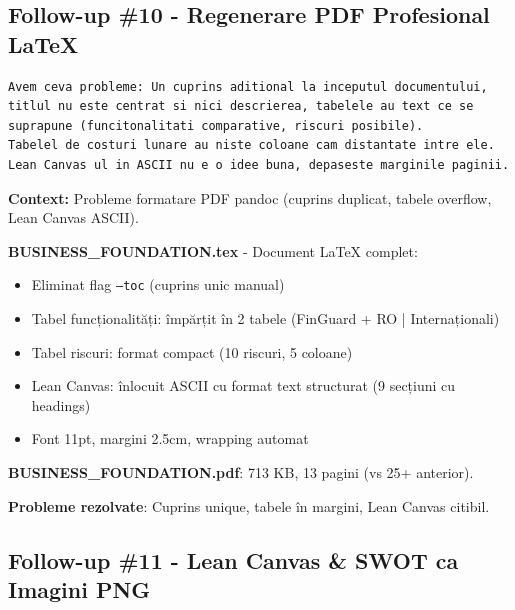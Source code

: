 \documentclass[11pt,a4paper]{article}
\begin{document}
\newpage
\subsection{Follow-up \#10 - Regenerare PDF Profesional LaTeX}

\begin{tcolorbox}[colback=promptbackground,colframe=blue!75!black,title=Prompt Input]
\begin{verbatim}
Avem ceva probleme: Un cuprins aditional la inceputul documentului,
titlul nu este centrat si nici descrierea, tabelele au text ce se
suprapune (funcitonalitati comparative, riscuri posibile).
Tabelel de costuri lunare au niste coloane cam distantate intre ele.
Lean Canvas ul in ASCII nu e o idee buna, depaseste marginile paginii.
\end{verbatim}
\end{tcolorbox}

\textbf{Context:} Probleme formatare PDF pandoc (cuprins duplicat, tabele overflow, Lean Canvas ASCII).

\begin{tcolorbox}[colback=outputbackground,colframe=green!75!black,title=Output Generat]
\textbf{BUSINESS\_FOUNDATION.tex} - Document LaTeX complet:
\begin{itemize}[leftmargin=*]
    \item Eliminat flag \texttt{--toc} (cuprins unic manual)
    \item Tabel funcționalități: împărțit în 2 tabele (FinGuard + RO | Internaționali)
    \item Tabel riscuri: format compact (10 riscuri, 5 coloane)
    \item Lean Canvas: înlocuit ASCII cu format text structurat (9 secțiuni cu headings)
    \item Font 11pt, margini 2.5cm, wrapping automat
\end{itemize}

\textbf{BUSINESS\_FOUNDATION.pdf}: 713 KB, 13 pagini (vs 25+ anterior).

\textbf{Probleme rezolvate}: Cuprins unique, tabele în margini, Lean Canvas citibil.
\end{tcolorbox}

\subsection{Follow-up \#11 - Lean Canvas \& SWOT ca Imagini PNG}
\end{document}
